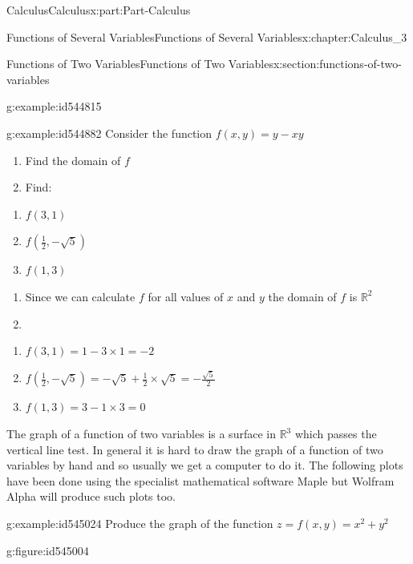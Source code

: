 \documentclass[oneside,10pt,]{book}
\numberwithin{equation}{section}
\begin{document}
\begin{partptx}{Calculus}{}{Calculus}{}{}{x:part:Part-Calculus}
\begin{chapterptx}{Functions of Several Variables}{}{Functions of Several Variables}{}{}{x:chapter:Calculus_3}
\begin{sectionptx}{Functions of Two Variables}{}{Functions of Two Variables}{}{}{x:section:functions-of-two-variables}
\begin{example}{}{g:example:id544815}
\begin{enumerate}[label=\roman*.]
\end{enumerate}
%
\end{example}
\begin{example}{}{g:example:id544882}%
Consider the function \(f(x,y)=y-xy\)%
\par
%
\begin{enumerate}[label=\alph*.]
\item{}Find the domain of \(f\)%
\item{}Find:%
\end{enumerate}
%
\par
%
\begin{enumerate}[label=\roman*.]
\item{}\(\displaystyle f(3,1)\)%
\item{}\(\displaystyle f(\frac{1}{2},-\sqrt{5})\)%
\item{}\(\displaystyle f(1,3)\)%
\end{enumerate}
%
\par\smallskip%
\noindent\hypertarget{g:solution:id544930}{}%
\begin{enumerate}[label=\alph*.]
\item{}Since we can calculate \(f\) for all values of \(x\) and \(y\) the domain of \(f\) is \(\mathbb{R}^2\)%
\item{}%
\end{enumerate}
%
\par
%
\begin{enumerate}[label=\roman*.]
\item{}\(\displaystyle f(3,1)=1-3\times 1=-2\)%
\item{}\(\displaystyle f(\frac{1}{2},-\sqrt{5})=-\sqrt{5}+\frac{1}{2}\times\sqrt{5}=-\frac{\sqrt{5}}{2}\)%
\item{}\(\displaystyle f(1,3)=3-1\times 3=0\)%
\end{enumerate}
%
\end{example}
The graph of a function of two variables is a surface in \(\mathbb{R}^3\) which passes the vertical line test. In general it is hard to draw the graph of a function of two variables by hand and so usually we get a computer to do it. The following plots have been done using the specialist mathematical software Maple but Wolfram Alpha will produce such plots too.%
\begin{example}{}{g:example:id545024}%
Produce the graph of the function \(z=f(x,y)=x^2+y^2\)%
\par\smallskip%
\noindent\hypertarget{g:solution:id545012}{}\begin{figureptx}{}{g:figure:id545004}{}%

\end{figureptx}
\end{example}
\end{sectionptx}
\end{chapterptx}
\end{partptx}
\end{document}
